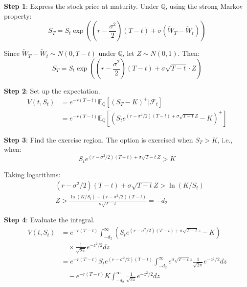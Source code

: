 \documentclass[
  letterpaper,
  DIV=11,
  numbers=noendperiod]{scrartcl}
\begin{document}
\begin{tcolorbox}[enhanced jigsaw, colback=white, rightrule=.15mm, coltitle=black, left=2mm, colframe=quarto-callout-note-color-frame, breakable, arc=.35mm, bottomtitle=1mm, toptitle=1mm, titlerule=0mm, leftrule=.75mm, colbacktitle=quarto-callout-note-color!10!white, title=\textcolor{quarto-callout-note-color}{\faInfo}\hspace{0.5em}{Proof of Theorem 3.3}, toprule=.15mm, opacitybacktitle=0.6, bottomrule=.15mm, opacityback=0]

\textbf{Step 1}: Express the stock price at maturity. Under
\(\mathbb{Q}\), using the strong Markov property:
\[S_T = S_t \exp\left(\left(r - \frac{\sigma^2}{2}\right)(T-t) + \sigma (\tilde{W}_T - \tilde{W}_t)\right)\]

Since \(\tilde{W}_T - \tilde{W}_t \sim N(0, T-t)\) under \(\mathbb{Q}\),
let \(Z \sim N(0,1)\). Then:
\[S_T = S_t \exp\left(\left(r - \frac{\sigma^2}{2}\right)(T-t) + \sigma\sqrt{T-t} \cdot Z\right)\]

\textbf{Step 2}: Set up the expectation. \begin{align}
V(t, S_t) &= e^{-r(T-t)} \mathbb{E}_\mathbb{Q}[(S_T - K)^+ | \mathcal{F}_t] \\
&= e^{-r(T-t)} \mathbb{E}_\mathbb{Q}\left[\left(S_t e^{(r-\sigma^2/2)(T-t) + \sigma\sqrt{T-t} Z} - K\right)^+\right]
\end{align}

\textbf{Step 3}: Find the exercise region. The option is exercised when
\(S_T > K\), i.e., when:
\[S_t e^{(r-\sigma^2/2)(T-t) + \sigma\sqrt{T-t} Z} > K\]

Taking logarithms: \begin{align}
&(r-\sigma^2/2)(T-t) + \sigma\sqrt{T-t} Z > \ln(K/S_t) \\
&Z > \frac{\ln(K/S_t) - (r-\sigma^2/2)(T-t)}{\sigma\sqrt{T-t}} = -d_2
\end{align}

\textbf{Step 4}: Evaluate the integral. \begin{align}
V(t, S_t) &= e^{-r(T-t)} \int_{-d_2}^{\infty} \left(S_t e^{(r-\sigma^2/2)(T-t) + \sigma\sqrt{T-t} z} - K\right) \\
&\quad \times \frac{1}{\sqrt{2\pi}} e^{-z^2/2} dz \\
&= e^{-r(T-t)} S_t e^{(r-\sigma^2/2)(T-t)} \int_{-d_2}^{\infty} e^{\sigma\sqrt{T-t} z} \frac{1}{\sqrt{2\pi}} e^{-z^2/2} dz \\
&\quad - e^{-r(T-t)} K \int_{-d_2}^{\infty} \frac{1}{\sqrt{2\pi}} e^{-z^2/2} dz
\end{align}


\end{tcolorbox}
\end{document}
